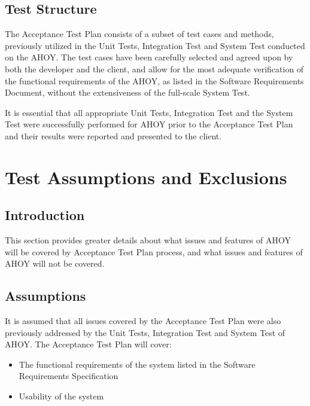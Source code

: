 \documentclass[titlepage]{article}
\begin{document}

\subsection{Test Structure%
    \label{structure}%
}
    The Acceptance Test Plan consists of a subset of test cases and methods, previously utilized in the Unit Tests, Integration Test and System Test conducted on the AHOY. The test cases have been carefully selected and agreed upon by both the developer and the client, and allow for the most adequate verification of the functional requirements of the AHOY, as listed in the Software Requirements Document, without the extensiveness of the full-scale System Test.

    It is essential that all appropriate Unit Tests, Integration Test and the System Test were successfully performed for AHOY prior to the Acceptance Test Plan and their results were reported and presented to the client.


\section{Test Assumptions and Exclusions%
    \label{assumptions}%
}


\subsection{Introduction}
    This section provides greater details about what issues and features of AHOY will be covered by Acceptance Test Plan process, and what issues and features of AHOY will not be covered.


\subsection{Assumptions}
    It is assumed that all issues covered by the Acceptance Test Plan were also previously addressed by the Unit Tests, Integration Test and System Test of AHOY. The Acceptance Test Plan will cover:
    \begin{itemize}
        \item The functional requirements of the system listed in the Software Requirements Specification
        \item Usability of the system
    \end{itemize}
\end{document}
